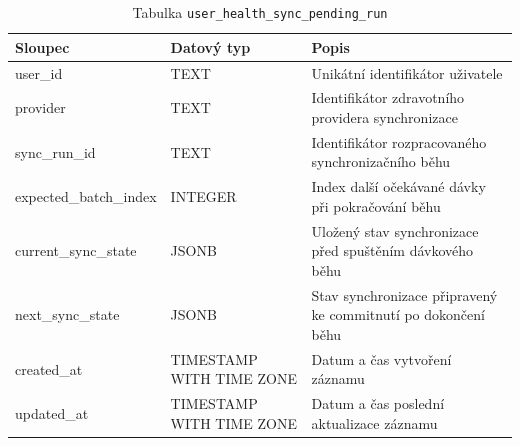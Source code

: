\begin{table}[ht!]
    \centering
    \begin{tabularx}{\textwidth}{|l|l|L|}
        \hline
        \textbf{Sloupec}       & \textbf{Datový typ}      & \textbf{Popis}                                                \\ \hline
        user\_id               & TEXT                     & Unikátní identifikátor uživatele                              \\ \hline
        provider               & TEXT                     & Identifikátor zdravotního providera synchronizace             \\ \hline
        sync\_run\_id          & TEXT                     & Identifikátor rozpracovaného synchronizačního běhu            \\ \hline
        expected\_batch\_index & INTEGER                  & Index další očekávané dávky při pokračování běhu              \\ \hline
        current\_sync\_state   & JSONB                    & Uložený stav synchronizace před spuštěním dávkového běhu      \\ \hline
        next\_sync\_state      & JSONB                    & Stav synchronizace připravený ke commitnutí po dokončení běhu \\ \hline
        created\_at            & TIMESTAMP WITH TIME ZONE & Datum a čas vytvoření záznamu                                 \\ \hline
        updated\_at            & TIMESTAMP WITH TIME ZONE & Datum a čas poslední aktualizace záznamu                      \\ \hline
    \end{tabularx}
    \caption{Tabulka \texttt{user\_health\_sync\_pending\_run}}
    \label{tab:user_health_sync_pending_run}
\end{table}
